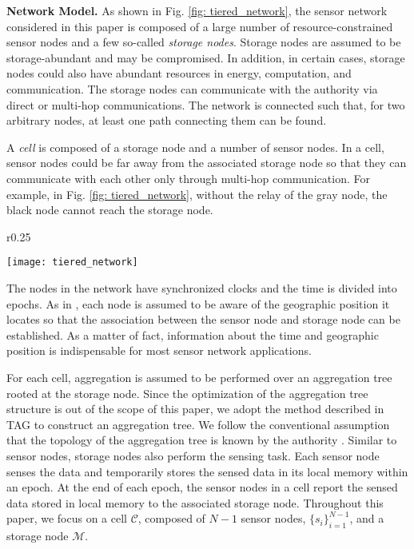 \documentclass[conference]{IEEEtran}
\begin{document}
\textbf{Network Model.} As shown in Fig. \ref{fig: tiered_network}, the sensor network considered in this paper is composed of a large number of resource-constrained sensor nodes and a few so-called \emph{storage nodes}. Storage nodes are assumed to be storage-abundant and may be compromised. In addition, in certain cases, storage nodes could also have abundant resources in energy, computation, and communication. The storage nodes can communicate with the authority via direct or multi-hop communications. The network is connected such that, for two arbitrary nodes, at least one path connecting them can be found.

A \emph{cell} is composed of a storage node and a number of sensor nodes. In a cell, sensor nodes could be far away from the associated storage node so that they can communicate with each other only through multi-hop communication. For example, in Fig. \ref{fig: tiered_network}, without the relay of the gray node, the black node cannot reach the storage node. \begin{wrapfigure}{r}{0.25\textwidth}
  \begin{center}
    \texttt{[image: tiered\_network]}
  \end{center}
  \caption{\footnotesize A tiered sensor network.}
  \label{fig: tiered_network}
\end{wrapfigure} The nodes in the network have synchronized clocks \cite{snwlz06} and the time is divided into epochs. As in \cite{sl08,slm06,szz09,zsz09}, each node is assumed to be aware of the geographic position it locates \cite{lnd05,zlfw06} so that the association between the sensor node and storage node can be established. As a matter of fact, information about the time and geographic position is indispensable for most sensor network applications.

For each cell, aggregation is assumed to be performed over an aggregation tree rooted at the storage node. Since the optimization of the aggregation tree structure is out of the scope of this paper, we adopt the method described in TAG \cite{mfhh02} to construct an aggregation tree. We follow the conventional assumption that the topology of the aggregation tree is known by the authority \cite{cp08,cps06}. Similar to sensor nodes, storage nodes also perform the sensing task. Each sensor node senses the data and temporarily stores the sensed data in its local memory within an epoch. At the end of each epoch, the sensor nodes in a cell report the sensed data stored in local memory to the associated storage node. Throughout this paper, we focus on a cell $\mathcal{C}$, composed of $N-1$ sensor nodes, $\{s_i\}_{i=1}^{N-1}$, and a storage node $\mathcal{M}$.
\end{document}
